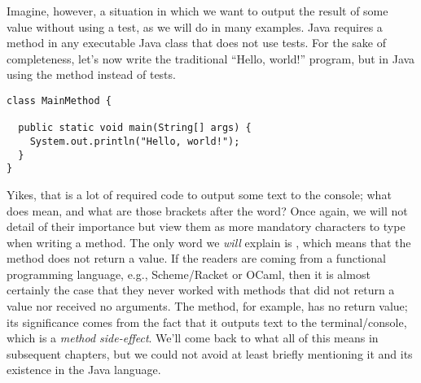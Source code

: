 Imagine, however, a situation in which we want to output the result of some value without using a test, as we will do in many examples. Java requires a  method in any executable Java class that does not use tests. For the sake of completeness, let's now write the traditional ``Hello, world!'' program, but in Java using the  method instead of tests.

\begin{lstlisting}[language=MyJava]
class MainMethod {

  public static void main(String[] args) {
    System.out.println("Hello, world!");
  }
}
\end{lstlisting}

Yikes, that is a lot of required code to output some text to the console; what does  mean, and what are those \ttt{[]} brackets after the  word? Once again, we will not detail of their importance but view them as more mandatory characters to type when writing a  method. The only word we \emph{will} explain is , which means that the method does not return a value. If the readers are coming from a functional programming language, e.g., Scheme/Racket or OCaml, then it is almost certainly the case that they never worked with methods that did not return a value nor received no arguments. The  method, for example, has no return value; its significance comes from the fact that it outputs text to the terminal/console, which is a \emph{method side-effect}. We'll come back to what all of this means in subsequent chapters, but we could not avoid at least briefly mentioning it and its existence in the Java language.





